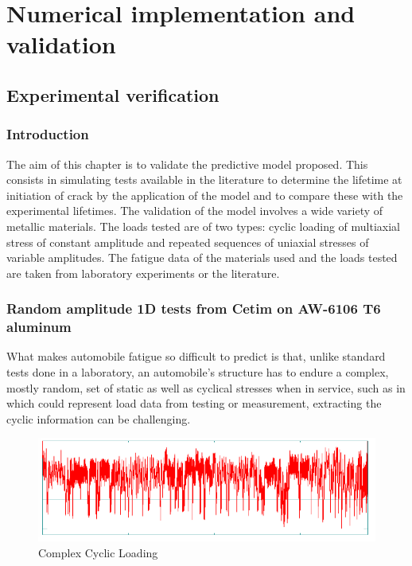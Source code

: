 \chapter{Numerical implementation and validation}\label{chp:6}
\minitoc
\section{Experimental verification}

\subsection{Introduction}
The aim of this chapter is to validate the predictive model proposed. This consists in simulating tests available in the literature to determine the lifetime at initiation of crack by the application of the model and to compare these with the experimental lifetimes. The validation of the model involves a wide variety of metallic materials. The loads tested are of two types: cyclic loading of multiaxial stress of constant amplitude and repeated sequences of uniaxial stresses of variable amplitudes. The fatigue data of the materials used and the loads tested are taken from laboratory experiments or the literature.

\newpage
\subsection{Random amplitude 1D tests from Cetim on AW-6106 T6 aluminum}

What makes automobile fatigue so difficult to predict is that, unlike standard tests done in a laboratory, an automobile's structure has to endure a complex, mostly random, set of static as well as cyclical stresses when in service, such as in  which could represent load data from testing or measurement, extracting the cyclic information can be challenging. 
\begin{figure}[h!]
	\centering
	\includegraphics[width=\textwidth]{figures//complexloading.png} 
	\caption{Complex Cyclic Loading}
	\label{complexloading}
\end{figure}

